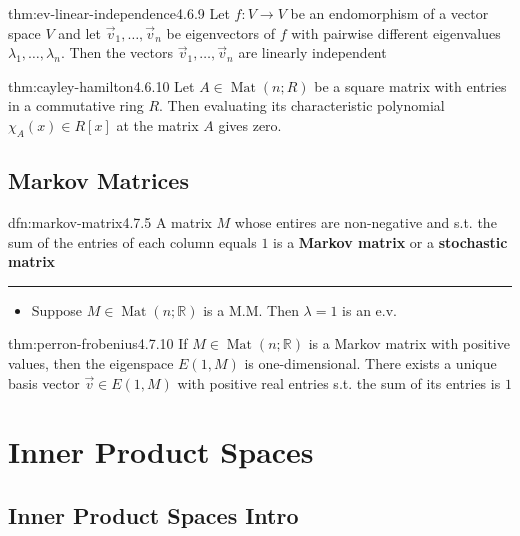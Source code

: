 \documentclass[landscape, 8pt]{extarticle}
\DeclareMathOperator{\Mat}{Mat}
\begin{document}
\begin{multicols}{3}
\begin{thm}{thm:ev-linear-independence}{4.6.9}
    Let $f : V\to V$ be an endomorphism of a vector space $V$ and let $\vec{v}_{1},\dots,\vec{v}_{n}$ be eigenvectors of $f$ with pairwise different eigenvalues $\lambda_{1},\dots,\lambda_{n}$. Then the vectors $\vec{v}_{1},\dots,\vec{v}_{n}$ are linearly independent
\end{thm}

\begin{thm}{thm:cayley-hamilton}{4.6.10}
    Let $A\in \Mat(n;R)$ be a square matrix with entries in a commutative ring $R$. Then evaluating its characteristic polynomial $\chi_{A}(x)\in R[x]$ at the matrix $A$ gives zero.
\end{thm}

\subsection{Markov Matrices}

\begin{dfn}{dfn:markov-matrix}{4.7.5}
    A matrix $M$ whose entires are non-negative and s.t. the sum of the entries of each column equals $1$ is a \textbf{Markov matrix} or a \textbf{stochastic matrix}

    \noindent\rule{\textwidth}{0.2pt}
    \begin{itemize}
        \setlength\itemsep{0em}
        \item[\textbf{4.7.6:}] Suppose $M\in \Mat(n;\mathbb{R})$ is a M.M. Then $\lambda = 1$ is an e.v.
    \end{itemize}
\end{dfn}

\begin{thm}{thm:perron-frobenius}{4.7.10}
    If $M\in \Mat(n;\mathbb{R})$ is a Markov matrix with positive values, then the eigenspace $E(1, M)$ is one-dimensional. There exists a unique basis vector $\vec{v}\in E(1,M)$ with positive real entries s.t. the sum of its entries is $1$
\end{thm}

\section{Inner Product Spaces}

\subsection{Inner Product Spaces Intro}


\end{multicols}
\end{document}
